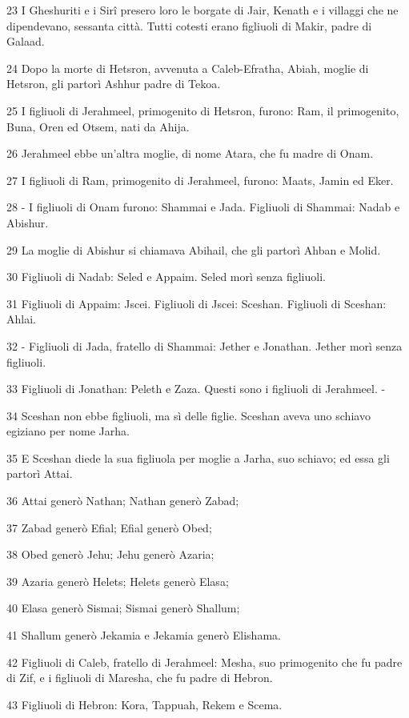 \par 23 I Gheshuriti e i Sirî presero loro le borgate di Jair, Kenath e i villaggi che ne dipendevano, sessanta città. Tutti cotesti erano figliuoli di Makir, padre di Galaad.
\par 24 Dopo la morte di Hetsron, avvenuta a Caleb-Efratha, Abiah, moglie di Hetsron, gli partorì Ashhur padre di Tekoa.
\par 25 I figliuoli di Jerahmeel, primogenito di Hetsron, furono: Ram, il primogenito, Buna, Oren ed Otsem, nati da Ahija.
\par 26 Jerahmeel ebbe un'altra moglie, di nome Atara, che fu madre di Onam.
\par 27 I figliuoli di Ram, primogenito di Jerahmeel, furono: Maats, Jamin ed Eker.
\par 28 - I figliuoli di Onam furono: Shammai e Jada. Figliuoli di Shammai: Nadab e Abishur.
\par 29 La moglie di Abishur si chiamava Abihail, che gli partorì Ahban e Molid.
\par 30 Figliuoli di Nadab: Seled e Appaim. Seled morì senza figliuoli.
\par 31 Figliuoli di Appaim: Jscei. Figliuoli di Jscei: Sceshan. Figliuoli di Sceshan: Ahlai.
\par 32 - Figliuoli di Jada, fratello di Shammai: Jether e Jonathan. Jether morì senza figliuoli.
\par 33 Figliuoli di Jonathan: Peleth e Zaza. Questi sono i figliuoli di Jerahmeel. -
\par 34 Sceshan non ebbe figliuoli, ma sì delle figlie. Sceshan aveva uno schiavo egiziano per nome Jarha.
\par 35 E Sceshan diede la sua figliuola per moglie a Jarha, suo schiavo; ed essa gli partorì Attai.
\par 36 Attai generò Nathan; Nathan generò Zabad;
\par 37 Zabad generò Efial; Efial generò Obed;
\par 38 Obed generò Jehu; Jehu generò Azaria;
\par 39 Azaria generò Helets; Helets generò Elasa;
\par 40 Elasa generò Sismai; Sismai generò Shallum;
\par 41 Shallum generò Jekamia e Jekamia generò Elishama.
\par 42 Figliuoli di Caleb, fratello di Jerahmeel: Mesha, suo primogenito che fu padre di Zif, e i figliuoli di Maresha, che fu padre di Hebron.
\par 43 Figliuoli di Hebron: Kora, Tappuah, Rekem e Scema.

